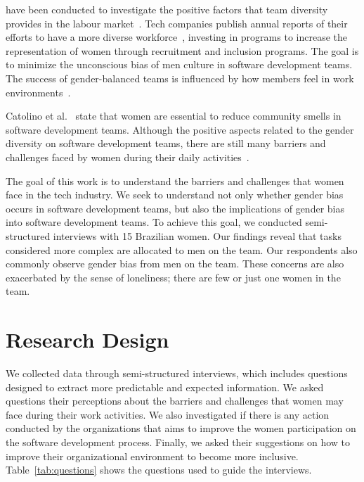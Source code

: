 \documentclass{IEEEcsmag}
\begin{document}
 have been conducted to investigate the positive factors that team diversity provides in the labour market~\cite{DBLP:conf/icse/WangWR19}. Tech companies publish annual reports of their efforts to have a more diverse workforce~\cite{google2019,linkedin2019}, investing in programs to increase the representation of women through recruitment and inclusion programs. The goal is to minimize the unconscious bias of men culture in software development teams. The success of gender-balanced teams is influenced by how members feel in work environments~\cite{meulders2010topic}. 

Catolino et al.~\cite{DBLP:conf/icse/CatolinoPTSF19} state that women are essential to reduce community smells in software development teams. Although the positive aspects related to the gender diversity on software development teams, there are still many barriers and challenges faced by women during their daily activities~\cite{DBLP:conf/icse/WangR19}. 


The goal of this work is to understand the barriers and challenges that women face in the tech industry. We seek to understand not only whether gender bias occurs in software development teams, but also the implications of gender bias into software development teams. To achieve this goal, we conducted semi-structured interviews with 15 Brazilian women. %
Our findings reveal that tasks considered more complex are allocated to men on the team. Our respondents also commonly observe gender bias from men on the team. These concerns are also exacerbated by the sense of loneliness; there are few or just one women in the team.

\section{Research Design}

We collected data through semi-structured interviews, which includes questions designed to extract more predictable and expected information. We asked questions their perceptions about the barriers and challenges that women may face during their work activities. We also investigated if there is any action conducted by the organizations that aims to improve the women participation on the software development process. Finally, we asked their suggestions on how to improve their organizational environment to become more inclusive. Table~\ref{tab:questions} shows the questions used to guide the interviews.
\end{document}
